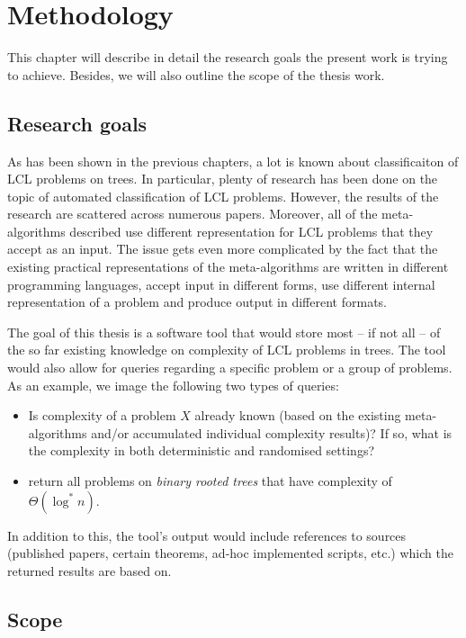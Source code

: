 \chapter{Methodology}
\label{chapter:methods}

This chapter will describe in detail the research goals the present work
is trying to achieve. Besides, we will also outline the scope of the thesis work.

\section{Research goals}

As has been shown in the previous chapters, a lot is known about classificaiton
of LCL problems on trees. In particular, plenty of research has been done
on the topic of automated classification of LCL problems. However, the
results of the research are scattered across numerous papers. Moreover,
all of the meta-algorithms described use different representation for LCL
problems that they accept as an input.
The issue gets even more complicated by the fact that the existing practical representations
of the meta-algorithms are written in different programming languages, accept input in
different forms,
use different internal representation of a problem and produce output in different
formats.

The goal of this thesis is a software tool that would store most -- if not all -- of
the so far existing knowledge on complexity of LCL problems in trees.
The tool would also allow for queries regarding a specific problem or a group of
problems. As an example, we image the following two types of queries:
\begin{itemize}
  \item Is complexity of a problem $X$ already known (based on the existing meta-algorithms
  and/or accumulated individual complexity results)? If so, what is the complexity in both
  deterministic and randomised settings?
  \item return all problems on \emph{binary rooted trees} that have complexity of
  $\Theta(\log^* n)$.
\end{itemize}
In addition to this, the tool’s output would include references to sources
(published papers, certain theorems, ad-hoc implemented scripts, etc.)
which the returned results are based on.

\section{Scope}

